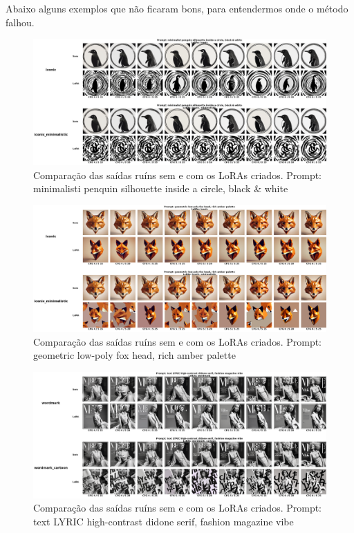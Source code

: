 \documentclass[12pt, %
openright, 
oneside, %
a4paper,    %
brazil]{facom-ufu-abntex2}
\begin{document}
Abaixo alguns exemplos que não ficaram bons, para entendermos onde o método falhou.

\begin{figure}[H]
    \centering
    \includegraphics[width=1.0\linewidth]{figuras/resultados/bad/cmp_p1_batch2.png}
    \caption[1º Comparação das saídas ruíns sem e com os LoRAs criados.]{Comparação das saídas ruíns sem e com os LoRAs criados. Prompt: minimalisti penquin silhouette inside a circle, black \& white}
    \label{fig:badCmpP1Batch2}
\end{figure}

\begin{figure}[H]
    \centering
    \includegraphics[width=1.0\linewidth]{figuras/resultados/bad/cmp_p5_batch1.png}
    \caption[2º Comparação das saídas ruíns sem e com os LoRAs criados.]{Comparação das saídas ruíns sem e com os LoRAs criados. Prompt: geometric low-poly fox head, rich amber palette}
    \label{fig:badCmpP5Batch1}
\end{figure}

\begin{figure}[H]
    \centering
    \includegraphics[width=1.0\linewidth]{figuras/resultados/bad/cmp_p26_batch0.png}
    \caption[3º Comparação das saídas ruíns sem e com os LoRAs criados.]{Comparação das saídas ruíns sem e com os LoRAs criados. Prompt: text LYRIC high-contrast didone serif, fashion magazine vibe}
    \label{fig:badCmpP26Batch0}
\end{figure}
\end{document}

